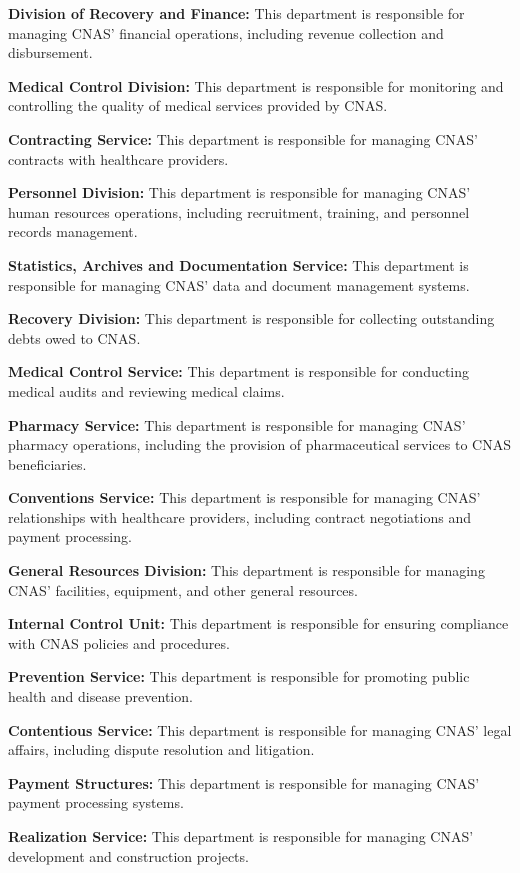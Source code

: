 \textbf{Division of Recovery and Finance:} This department is responsible for managing CNAS' financial operations, including revenue collection and disbursement.

\textbf{Medical Control Division:} This department is responsible for monitoring and controlling the quality of medical services provided by CNAS.

\textbf{Contracting Service:} This department is responsible for managing CNAS' contracts with healthcare providers.

\textbf{Personnel Division:} This department is responsible for managing CNAS' human resources operations, including recruitment, training, and personnel records management.

\textbf{Statistics, Archives and Documentation Service:} This department is responsible for managing CNAS' data and document management systems.

\textbf{Recovery Division:} This department is responsible for collecting outstanding debts owed to CNAS.

\textbf{Medical Control Service:} This department is responsible for conducting medical audits and reviewing medical claims.

\textbf{Pharmacy Service:} This department is responsible for managing CNAS' pharmacy operations, including the provision of pharmaceutical services to CNAS beneficiaries.

\textbf{Conventions Service:} This department is responsible for managing CNAS' relationships with healthcare providers, including contract negotiations and payment processing.

\textbf{General Resources Division:} This department is responsible for managing CNAS' facilities, equipment, and other general resources.

\textbf{Internal Control Unit:} This department is responsible for ensuring compliance with CNAS policies and procedures.

\textbf{Prevention Service:} This department is responsible for promoting public health and disease prevention.

\textbf{Contentious Service:} This department is responsible for managing CNAS' legal affairs, including dispute resolution and litigation.

\textbf{Payment Structures:} This department is responsible for managing CNAS' payment processing systems.

\textbf{Realization Service:} This department is responsible for managing CNAS' development and construction projects.

